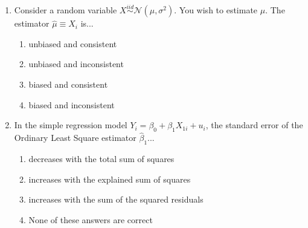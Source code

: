 \documentclass{article}
\begin{document}
\begin{enumerate}
\begin{enumerate}[label=\alph*)]
\item \begin{equation*}
    \frac{\sum_i Y_iX_{2i}-\hat{\beta_0}\sum_i X_{2i}}{\sum_i X_{2i}^2}
\end{equation*}

\item \begin{equation*}
    \frac{\sum_i Y_iX_{2i}-\hat{\beta_0}\sum_i X_{2i}}{\sum_i (X_{2i}-\overline{X}_2)^2}
\end{equation*}

\item \begin{equation*}
    \frac{\sum_i Y_iX_{1i}-\hat{\beta_0}\sum_i X_{1i}}{\sum_i X_{1i}^2}
\end{equation*}

\item \begin{equation*}
    \frac{\sum_i Y_iX_{1i}-\hat{\beta_0}\sum_i X_{1i}}{\sum_i (X_{1i}-\overline{X}_1)^2}
\end{equation*}

\end{enumerate}\vspace{.25cm}

\item Consider a random variable $X\stackrel{iid}{\sim}\mathcal{N}(\mu, \sigma^2)$. You wish to estimate $\mu$. The estimator $\hat{\mu}\equiv X_i$ is...

\begin{enumerate}[label=\alph*)]
\item unbiased and consistent
\item unbiased and inconsistent
\item biased and consistent
\item biased and inconsistent
\end{enumerate}\vspace{.25cm}

\item In the simple regression model $Y_i = \beta_0 + \beta_1 X_{1i} + u_i$, the standard error of the Ordinary Least Square estimator $\hat{\beta}_1$...

\begin{enumerate}[label=\alph*)]
\item decreases with the total sum of squares
\item increases with the explained sum of squares
\item increases with the sum of the squared residuals
\item None of these answers are correct
\end{enumerate}\vspace{.25cm}


\end{enumerate}
\end{document}
